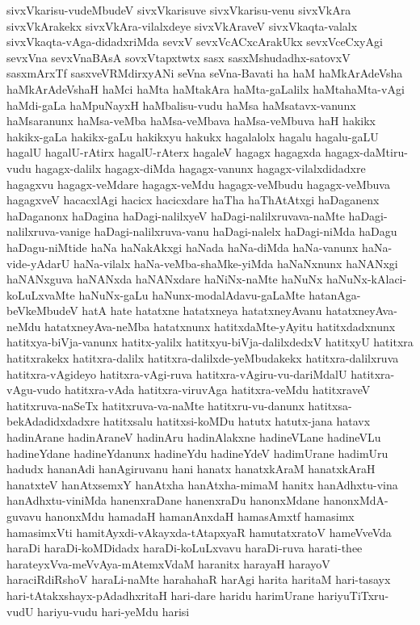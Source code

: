 {sivxVkarisu-vudeMbudeV
sivxVkarisuve
sivxVkarisu-venu
sivxVkAra
sivxVkArakekx
sivxVkAra-vilalxdeye
sivxVkAraveV
sivxVkaqta-valalx
sivxVkaqta-vAga-didadxriMda
sevxV
sevxVcACxcArakUkx
sevxVceCxyAgi
sevxVna
sevxVnaBAsA
sovxVtapxtwtx
sasx
sasxMshudadhx-satovxV
sasxmArxTf
sasxveVRMdirxyANi
seVna
seVna-Bavati
ha
haM
haMkArAdeVsha
haMkArAdeVshaH
haMci
haMta
haMtakAra
haMta-gaLalilx
haMtahaMta-vAgi
haMdi-gaLa
haMpuNayxH
haMbalisu-vudu
haMsa
haMsatavx-vanunx
haMsaranunx
haMsa-veMba
haMsa-veMbava
haMsa-veMbuva
haH
hakikx
hakikx-gaLa
hakikx-gaLu
hakikxyu
hakukx
hagalalolx
hagalu
hagalu-gaLU
hagalU
hagalU-rAtirx
hagalU-rAterx
hagaleV
hagagx
hagagxda
hagagx-daMtiru-vudu
hagagx-dalilx
hagagx-diMda
hagagx-vanunx
hagagx-vilalxdidadxre
hagagxvu
hagagx-veMdare
hagagx-veMdu
hagagx-veMbudu
hagagx-veMbuva
hagagxveV
hacacxlAgi
hacicx
hacicxdare
haTha
haThAtAtxgi
haDaganenx
haDaganonx
haDagina
haDagi-nalilxyeV
haDagi-nalilxruvava-naMte
haDagi-nalilxruva-vanige
haDagi-nalilxruva-vanu
haDagi-nalelx
haDagi-niMda
haDagu
haDagu-niMtide
haNa
haNakAkxgi
haNada
haNa-diMda
haNa-vanunx
haNa-vide-yAdarU
haNa-vilalx
haNa-veMba-shaMke-yiMda
haNaNxnunx
haNANxgi
haNANxguva
haNANxda
haNANxdare
haNiNx-naMte
haNuNx
haNuNx-kAlaci-koLuLxvaMte
haNuNx-gaLu
haNunx-modalAdavu-gaLaMte
hatanAga-beVkeMbudeV
hatA
hate
hatatxne
hatatxneya
hatatxneyAvanu
hatatxneyAva-neMdu
hatatxneyAva-neMba
hatatxnunx
hatitxdaMte-yAyitu
hatitxdadxnunx
hatitxya-biVja-vanunx
hatitx-yalilx
hatitxyu-biVja-dalilxdedxV
hatitxyU
hatitxra
hatitxrakekx
hatitxra-dalilx
hatitxra-dalilxde-yeMbudakekx
hatitxra-dalilxruva
hatitxra-vAgideyo
hatitxra-vAgi-ruva
hatitxra-vAgiru-vu-dariMdalU
hatitxra-vAgu-vudo
hatitxra-vAda
hatitxra-viruvAga
hatitxra-veMdu
hatitxraveV
hatitxruva-naSeTx
hatitxruva-va-naMte
hatitxru-vu-danunx
hatitxsa-bekAdadidxdadxre
hatitxsalu
hatitxsi-koMDu
hatutx
hatutx-jana
hatavx
hadinArane
hadinAraneV
hadinAru
hadinAlakxne
hadineVLane
hadineVLu
hadineYdane
hadineYdanunx
hadineYdu
hadineYdeV
hadimUrane
hadimUru
hadudx
hananAdi
hanAgiruvanu
hani
hanatx
hanatxkAraM
hanatxkAraH
hanatxteV
hanAtxsemxY
hanAtxha
hanAtxha-mimaM
hanitx
hanAdhxtu-vina
hanAdhxtu-viniMda
hanenxraDane
hanenxraDu
hanonxMdane
hanonxMdA-guvavu
hanonxMdu
hamadaH
hamanAnxdaH
hamasAmxtf
hamasimx
hamasimxVti
hamitAyxdi-vAkayxda-tAtapxyaR
hamutatxratoV
hameVveVda
haraDi
haraDi-koMDidadx
haraDi-koLuLxvavu
haraDi-ruva
harati-thee
harateyxVva-meVvAya-mAtemxVdaM
haranitx
harayaH
harayoV
haraciRdiRshoV
haraLi-naMte
harahahaR
harAgi
harita
haritaM
hari-tasayx
hari-tAtakxshayx-pAdadhxritaH
hari-dare
haridu
harimUrane
hariyuTiTxru-vudU
hariyu-vudu
hari-yeMdu
harisi
}
